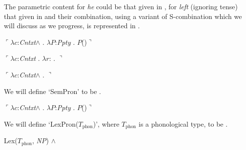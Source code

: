 The parametric content for
\textit{he} could be that given in , for \textit{left}
(ignoring tense) that given in  and their combination, using a variant
of S-combination which we will discuss as we progress, is represented
in .
\begin{ex} 
\begin{subex} 
 
\item $\ulcorner\lambda c$:\textit{Cntxt}\d{$\wedge$} . 
        $\lambda P$:\textit{Ppty} . $P$()$\urcorner$
 
\item $\ulcorner\lambda c$:\textit{Cntxt} . 
        $\lambda r$: . 
              $\urcorner$

            \item $\ulcorner\lambda c$:\textit{Cntxt}\d{$\wedge$}
  . 
         $\urcorner$
 
\end{subex} 
   
\end{ex}
We will define `SemPron' to be \nexteg{}.
\begin{ex} 
  $\ulcorner\lambda c$:\textit{Cntxt}\d{$\wedge$} . $\lambda P$:\textit{Ppty} . $P$()$\urcorner$
\end{ex}
We will define `LexPron($T_{\text{phon}}$)', where $T_{\text{phon}}$
is a phonological type, to be \nexteg{}.
\begin{ex} 
Lex($T_{\mathrm{phon}}$, \textit{NP}) \d{$\wedge$}
\end{ex}

